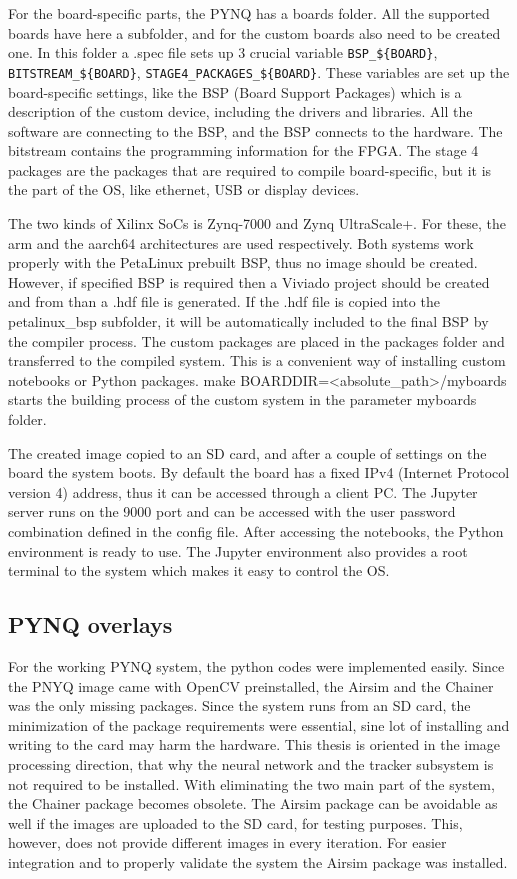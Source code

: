 For the board-specific parts, the PYNQ has a boards folder.
All the supported boards have here a subfolder, and for the custom boards also need to be created one.
In this folder a .spec file sets up 3 crucial variable \texttt{BSP\_\$\{BOARD\}}, \texttt{BITSTREAM\_\$\{BOARD\}}, \texttt{STAGE4\_PACKAGES\_\$\{BOARD\}}. 
These variables are set up the board-specific settings, like the BSP (Board Support Packages) which is a description of the custom device, including the drivers and libraries.
All the software are connecting to the BSP, and the BSP connects to the hardware.
The bitstream contains the programming information for the FPGA.
The stage 4 packages are the packages that are required to compile board-specific, but it is the part of the OS, like ethernet, USB or display devices.

The two kinds of Xilinx SoCs is Zynq-7000 and Zynq UltraScale+.
For these, the arm and the aarch64 architectures are used respectively.
Both systems work properly with the PetaLinux prebuilt BSP, thus no image should be created.
However, if specified BSP is required then a Viviado project should be created and from than a .hdf file is generated.
If the .hdf file is copied into the petalinux\_bsp subfolder, it will be automatically included to the final BSP by the compiler process.
The custom packages are placed in the packages folder and transferred to the compiled system.
This is a convenient way of installing custom notebooks or Python packages.
make BOARDDIR=<absolute\_path>/myboards starts the building process of the custom system in the parameter myboards folder.

The created image copied to an SD card, and after a couple of settings on the board the system boots.
By default the board has a fixed IPv4 (Internet Protocol version 4) address, thus it can be accessed through a client PC.
The Jupyter server runs on the 9000 port and can be accessed with the user password combination defined in the config file.
After accessing the notebooks, the Python environment is ready to use.
The Jupyter environment also provides a root terminal to the system which makes it easy to control the OS.

\subsection{PYNQ overlays} %
For the working PYNQ system, the python codes were implemented easily.
Since the PNYQ image came with OpenCV preinstalled, the Airsim and the Chainer was the only missing packages.
Since the system runs from an SD card, the minimization of the package requirements were essential, sine lot of installing and writing to the card may harm the hardware.
This thesis is oriented in the image processing direction, that why the neural network and the tracker subsystem is not required to be installed.
With eliminating the two main part of the system, the Chainer package becomes obsolete.
The Airsim package can be avoidable as well if the images are uploaded to the SD card, for testing purposes.
This, however, does not provide different images in every iteration.
For easier integration and to properly validate the system the Airsim package was installed.

